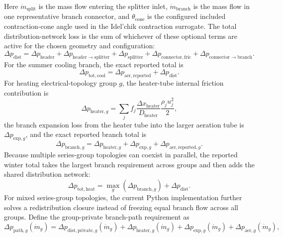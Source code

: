 \documentclass[11pt]{article}
\begin{document}
Here \(\dot m_{\mathrm{split}}\) is the mass flow entering the splitter inlet, \(\dot m_{\mathrm{branch}}\) is the mass flow in one representative branch connector, and \(\theta_{\mathrm{cone}}\) is the configured included contraction-cone angle used in the Idel'chik contraction surrogate. The total distribution-network loss is the sum of whichever of these optional terms are active for the chosen geometry and configuration:
\begin{equation}
\label{eq:distribution_total_dp}
\Delta p_{\mathrm{dist}}=
\Delta p_{\mathrm{header}}+
\Delta p_{\mathrm{header\rightarrow splitter}}+
\Delta p_{\mathrm{splitter}}+
\Delta p_{\mathrm{connector,fric}}+
\Delta p_{\mathrm{connector\rightarrow branch}}.
\end{equation}
For the summer cooling branch, the exact reported total is
\begin{equation}
\label{eq:cooling_total_dp_exact}
\Delta p_{\mathrm{tot,cool}}=\Delta p_{\mathrm{aer,reported}}+\Delta p_{\mathrm{dist}}.
\end{equation}
For heating electrical-topology group \(g\), the heater-tube internal friction contribution is
\begin{equation}
\label{eq:heating_group_heater_dp}
\Delta p_{\mathrm{heater},g}=\sum_j f_j\frac{\Delta x_{\mathrm{heater}}}{D_{\mathrm{heater}}}\frac{\rho_j u_j^2}{2},
\end{equation}
the branch expansion loss from the heater tube into the larger aeration tube is \(\Delta p_{\mathrm{exp},g}\), and the exact reported branch total is
\begin{equation}
\label{eq:heating_group_branch_dp_exact}
\Delta p_{\mathrm{branch},g}=
\Delta p_{\mathrm{heater},g}+
\Delta p_{\mathrm{exp},g}+
\Delta p_{\mathrm{aer,reported},g}.
\end{equation}
Because multiple series-group topologies can coexist in parallel, the reported winter total takes the largest branch requirement across groups and then adds the shared distribution network:
\begin{equation}
\label{eq:heating_total_dp_exact}
\Delta p_{\mathrm{tot,heat}}=
\max_g\!\left(\Delta p_{\mathrm{branch},g}\right)+\Delta p_{\mathrm{dist}}.
\end{equation}
For mixed series-group topologies, the current Python implementation further solves a redistribution closure instead of freezing equal branch flow across all groups. Define the group-private branch-path requirement as
\begin{equation}
\label{eq:group_private_path_dp}
\Delta p_{\mathrm{path},g}(\dot m_g)=
\Delta p_{\mathrm{dist,private},g}(\dot m_g)
+\Delta p_{\mathrm{heater},g}(\dot m_g)
+\Delta p_{\mathrm{exp},g}(\dot m_g)
+\Delta p_{\mathrm{aer},g}(\dot m_g),
\end{equation}
\end{document}
